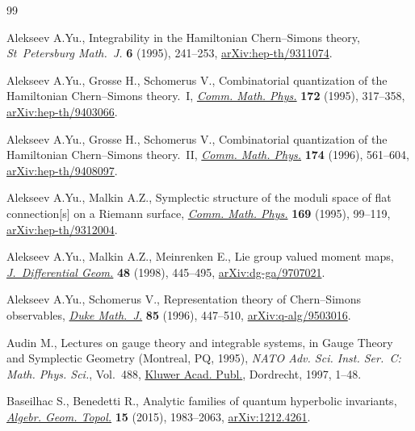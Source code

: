 \documentclass[pdftex]{sigma}%
\numberwithin{equation}{section}
\numberwithin{figure}{section}
\begin{document}
\begin{thebibliography}{99}
\footnotesize\itemsep=0pt

Alekseev A.Yu., Integrability in the {H}amiltonian {C}hern--{S}imons theory,
 \textit{St~Petersburg Math.~J.} \textbf{6} (1995), 241--253,
 \href{https://arxiv.org/abs/hep-th/9311074}{arXiv:hep-th/9311074}.

Alekseev A.Yu., Grosse H., Schomerus V., Combinatorial quantization of the
 {H}amiltonian {C}hern--{S}imons theory.~{I}, \href{https://doi.org/10.1007/BF02099431}{\textit{Comm. Math. Phys.}}
 \textbf{172} (1995), 317--358, \href{https://arxiv.org/abs/hep-th/9403066}{arXiv:hep-th/9403066}.

Alekseev A.Yu., Grosse H., Schomerus V., Combinatorial quantization of the
 {H}amiltonian {C}hern--{S}imons theory.~{II}, \href{https://doi.org/10.1007/BF02101528}{\textit{Comm. Math. Phys.}}
 \textbf{174} (1996), 561--604, \href{https://arxiv.org/abs/hep-th/9408097}{arXiv:hep-th/9408097}.

Alekseev A.Yu., Malkin A.Z., Symplectic structure of the moduli space of flat
 connection[s] on a {R}iemann surface, \href{https://doi.org/10.1007/BF02101598}{\textit{Comm. Math. Phys.}} \textbf{169}
 (1995), 99--119, \href{https://arxiv.org/abs/hep-th/9312004}{arXiv:hep-th/9312004}.

Alekseev A.Yu., Malkin A.Z., Meinrenken E., Lie group valued moment maps,
 \href{https://doi.org/10.4310/jdg/1214460860}{\textit{J.~Differential Geom.}} \textbf{48} (1998), 445--495,
 \href{https://arxiv.org/abs/dg-ga/9707021}{arXiv:dg-ga/9707021}.

Alekseev A.Yu., Schomerus V., Representation theory of {C}hern--{S}imons
 observables, \href{https://doi.org/10.1215/S0012-7094-96-08519-1}{\textit{Duke Math.~J.}} \textbf{85} (1996), 447--510,
 \href{https://arxiv.org/abs/q-alg/9503016}{arXiv:q-alg/9503016}.

Audin M., Lectures on gauge theory and integrable systems, in Gauge Theory and
 Symplectic Geometry ({M}ontreal, {PQ}, 1995), \textit{NATO Adv. Sci. Inst.
 Ser.~C: Math. Phys. Sci.}, Vol.~488, \href{https://doi.org/10.1007/978-94-017-1667-3_1}{Kluwer Acad. Publ.}, Dordrecht, 1997,
 1--48.

Baseilhac S., Benedetti R., Analytic families of quantum hyperbolic invariants,
 \href{https://doi.org/10.2140/agt.2015.15.1983}{\textit{Algebr. Geom. Topol.}} \textbf{15} (2015), 1983--2063,
 \href{https://arxiv.org/abs/1212.4261}{arXiv:1212.4261}.


\end{thebibliography}
\end{document}
